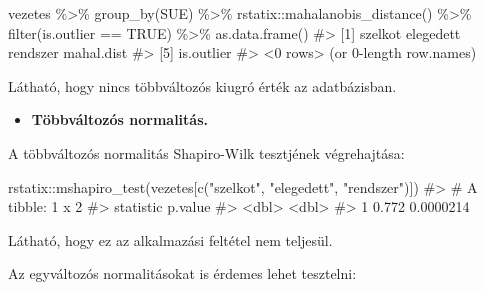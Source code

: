 \documentclass[
  letterpaper,
]{krantz}
\makeatletter
\newenvironment{Shaded}{\begin{snugshade}}{\end{snugshade}}
\newcommand{\CommentTok}[1]{\textcolor[rgb]{0.37,0.37,0.37}{#1}}
\newcommand{\ConstantTok}[1]{\textcolor[rgb]{0.56,0.35,0.01}{#1}}
\newcommand{\FunctionTok}[1]{\textcolor[rgb]{0.28,0.35,0.67}{#1}}
\newcommand{\NormalTok}[1]{\textcolor[rgb]{0.00,0.23,0.31}{#1}}
\newcommand{\SpecialCharTok}[1]{\textcolor[rgb]{0.37,0.37,0.37}{#1}}
\newcommand{\StringTok}[1]{\textcolor[rgb]{0.13,0.47,0.30}{#1}}
\providecommand{\tightlist}{%
  \setlength{\itemsep}{0pt}\setlength{\parskip}{0pt}}\usepackage{longtable,booktabs,array}
\newenvironment{kframe}{%
\medskip{}
\setlength{\fboxsep}{.8em}
 \def\at@end@of@kframe{}%
 \ifinner\ifhmode%
  \def\at@end@of@kframe{\end{minipage}}%
  \begin{minipage}{\columnwidth}%
 \fi\fi%
 \def\FrameCommand##1{\hskip\@totalleftmargin \hskip-\fboxsep
 \colorbox{shadecolor}{##1}\hskip-\fboxsep
     \hskip-\linewidth \hskip-\@totalleftmargin \hskip\columnwidth}%
 \MakeFramed {\advance\hsize-\width
   \@totalleftmargin\z@ \linewidth\hsize
   \@setminipage}}%
 {\par\unskip\endMakeFramed%
 \at@end@of@kframe}
\renewenvironment{Shaded}{\begin{kframe}}{\end{kframe}}
\makeatother
\begin{document}
\begin{Shaded}
\begin{Highlighting}[]
\NormalTok{vezetes }\SpecialCharTok{\%\textgreater{}\%}
    \FunctionTok{group\_by}\NormalTok{(SUE) }\SpecialCharTok{\%\textgreater{}\%}
\NormalTok{    rstatix}\SpecialCharTok{::}\FunctionTok{mahalanobis\_distance}\NormalTok{() }\SpecialCharTok{\%\textgreater{}\%}
    \FunctionTok{filter}\NormalTok{(is.outlier }\SpecialCharTok{==} \ConstantTok{TRUE}\NormalTok{) }\SpecialCharTok{\%\textgreater{}\%}
    \FunctionTok{as.data.frame}\NormalTok{()}
\CommentTok{\#\textgreater{} [1] szelkot    elegedett  rendszer   mahal.dist}
\CommentTok{\#\textgreater{} [5] is.outlier}
\CommentTok{\#\textgreater{} \textless{}0 rows\textgreater{} (or 0{-}length row.names)}
\end{Highlighting}
\end{Shaded}

Látható, hogy nincs többváltozós kiugró érték az adatbázisban.

\begin{itemize}
\tightlist
\item
  \textbf{Többváltozós normalitás.}
\end{itemize}

A többváltozós normalitás Shapiro-Wilk tesztjének végrehajtása:

\begin{Shaded}
\begin{Highlighting}[]
\NormalTok{rstatix}\SpecialCharTok{::}\FunctionTok{mshapiro\_test}\NormalTok{(vezetes[}\FunctionTok{c}\NormalTok{(}\StringTok{"szelkot"}\NormalTok{, }\StringTok{"elegedett"}\NormalTok{, }\StringTok{"rendszer"}\NormalTok{)])}
\CommentTok{\#\textgreater{} \# A tibble: 1 x 2}
\CommentTok{\#\textgreater{}   statistic   p.value}
\CommentTok{\#\textgreater{}       \textless{}dbl\textgreater{}     \textless{}dbl\textgreater{}}
\CommentTok{\#\textgreater{} 1     0.772 0.0000214}
\end{Highlighting}
\end{Shaded}

Látható, hogy ez az alkalmazási feltétel nem teljesül.

Az egyváltozós normalitásokat is érdemes lehet tesztelni:
\end{document}

